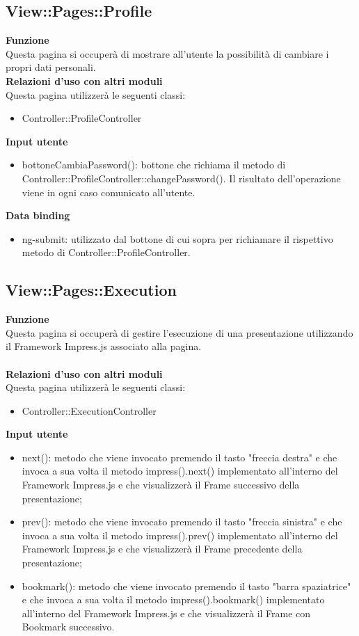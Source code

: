 {\subsection{View::Pages::Profile}{
	\textbf{Funzione}\\
	\indent Questa pagina si occuperà di mostrare all'utente la possibilità di cambiare i propri dati personali.\\
	\textbf{Relazioni d'uso con altri moduli}\\
	\indent Questa pagina utilizzerà le seguenti classi:
	\begin{itemize}
		\item Controller::ProfileController
	\end{itemize}
	\textbf{Input utente}
	\begin{itemize}
		\item bottoneCambiaPassword(): bottone che richiama il metodo di Controller::ProfileController::changePassword(). Il risultato dell'operazione viene in ogni caso comunicato all'utente.
	\end{itemize}
	\textbf{Data binding}
	\begin{itemize}
		\item ng-submit: utilizzato dal bottone di cui sopra per richiamare il rispettivo metodo di Controller::ProfileController.
	\end{itemize}
}
\subsection{View::Pages::Execution}{
	\textbf{Funzione}\\
	\indent Questa pagina si occuperà di gestire l'esecuzione di una presentazione utilizzando il Framework Impress.js associato alla pagina.\\\\
	\textbf{Relazioni d'uso con altri moduli}\\
	\indent Questa pagina utilizzerà le seguenti classi:
	\begin{itemize}
		\item Controller::ExecutionController
	\end{itemize}
	\textbf{Input utente}
	\begin{itemize}
		\item next(): metodo che viene invocato premendo il tasto "freccia destra" e che invoca a sua volta il metodo impress().next() implementato all'interno del Framework Impress.js e che visualizzerà il Frame successivo della presentazione;
		\item prev(): metodo che viene invocato premendo il tasto "freccia sinistra" e che invoca a sua volta il metodo impress().prev() implementato all'interno del Framework Impress.js e che visualizzerà il Frame precedente della presentazione;
		\item bookmark(): metodo che viene invocato premendo il tasto "barra spaziatrice" e che invoca a sua volta il metodo impress().bookmark() implementato all'interno del Framework Impress.js e che visualizzerà il Frame con Bookmark successivo.
	\end{itemize}
}
}
